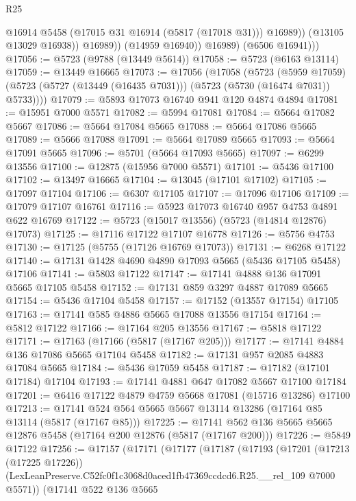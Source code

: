 \begin{lexlean}{R25}
\begin{coremodule}
                      @16914
                      @5458
                      (@17015 @31 @16914 (@5817 (@17018 @31)))
                      @16989))
                  (@13105 @13029 @16938))
                @16989))
            (@14959 @16940))
          @16989)
        (@6506 @16941)))
@17056 := @5723 (@9788 (@13449 @5614))
@17058 := @5723 (@6163 @13114)
@17059 := @13449 @16665
@17073 := @17056
    (@17058
      (@5723
        (@5959 @17059)
        (@5723 (@5727 (@13449 (@16435 @7031))) (@5723 (@5730 (@16474 @7031)) @5733))))
@17079 := @5893 @17073 @16740 @941 @120 @4874 @4894
@17081 := @15951 @7000 @5571
@17082 := @5994 @17081
@17084 := @5664 @17082 @5667
@17086 := @5664 @17084 @5665
@17088 := @5664 @17086 @5665
@17089 := @5666 @17088
@17091 := @5664 @17089 @5665
@17093 := @5664 @17091 @5665
@17096 := @5701 (@5664 @17093 @5665)
@17097 := @6299 @13556
@17100 := @12875 (@15956 @7000 @5571)
@17101 := @5436 @17100
@17102 := @13497 @16665
@17104 := @13045 (@17101 @17102)
@17105 := @17097 @17104
@17106 := @6307 @17105
@17107 := @17096 @17106
@17109 := @17079 @17107 @16761
@17116 := @5923 @17073 @16740 @957 @4753 @4891 @622 @16769
@17122 := @5723 (@15017 @13556) (@5723 (@14814 @12876) @17073)
@17125 := @17116 @17122 @17107 @16778
@17126 := @5756 @4753
@17130 := @17125 (@5755 (@17126 @16769 @17073))
@17131 := @6268 @17122
@17140 := @17131 @1428 @4690 @4890 @17093 @5665 (@5436 @17105 @5458) @17106
@17141 := @5803 @17122
@17147 := @17141 @4888 @136 @17091 @5665 @17105 @5458
@17152 := @17131 @859 @3297 @4887 @17089 @5665
@17154 := @5436 @17104 @5458
@17157 := @17152 (@13557 @17154) @17105
@17163 := @17141 @585 @4886 @5665 @17088 @13556 @17154
@17164 := @5812 @17122
@17166 := @17164 @205 @13556
@17167 := @5818 @17122
@17171 := @17163 (@17166 (@5817 (@17167 @205)))
@17177 := @17141 @4884 @136 @17086 @5665 @17104 @5458
@17182 := @17131 @957 @2085 @4883 @17084 @5665
@17184 := @5436 @17059 @5458
@17187 := @17182 (@17101 @17184) @17104
@17193 := @17141 @4881 @647 @17082 @5667 @17100 @17184
@17201 := @6416 @17122 @4879 @4759 @5668 @17081 (@15716 @13286) @17100
@17213 := @17141 @524 @564 @5665 @5667 @13114 @13286 (@17164 @85 @13114 (@5817 (@17167 @85)))
@17225 := @17141 @562 @136 @5665 @5665 @12876 @5458 (@17164 @200 @12876 (@5817 (@17167 @200)))
@17226 := @5849 @17122
@17256 := @17157
    (@17171
      (@17177
        (@17187
          (@17193
            (@17201
              (@17213 (@17225 @17226))
              (LexLeanPreserve.C52fc0f1c3068d0aced1fb47369ccdcd6.R25.__rel_109 @7000 @5571))
            (@17141
              @522
              @136
              @5665

\end{coremodule}
\end{lexlean}
